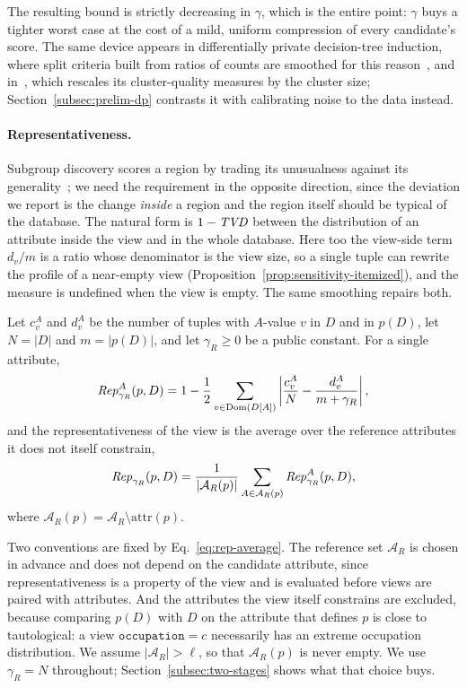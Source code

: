 The resulting bound is strictly decreasing in $\gamma$, which is the entire point: $\gamma$ buys a tighter worst case at the cost of a mild, uniform compression of every candidate's score.
The same device appears in differentially private decision-tree induction, where split criteria built from ratios of counts are smoothed for this reason~\cite{FriedmanSchuster10}, and in~\cite{DPClustX}, which rescales its cluster-quality measures by the cluster size; Section~\ref{subsec:prelim-dp} contrasts it with calibrating noise to the data instead.

\paragraph{Representativeness.}
Subgroup discovery scores a region by trading its unusualness against its generality~\cite{Wrobel97,HerreraCGJ11}; we need the requirement in the opposite direction, since the deviation we report is the change \emph{inside} a region and the region itself should be typical of the database.
The natural form is $1-\mathit{TVD}$ between the distribution of an attribute inside the view and in the whole database.
Here too the view-side term $d_v/m$ is a ratio whose denominator is the view size, so a single tuple can rewrite the profile of a near-empty view (Proposition~\ref{prop:sensitivity-itemized}), and the measure is undefined when the view is empty.
The same smoothing repairs both.

\begin{definition}
\label{def:rep}
Let $c^A_v$ and $d^A_v$ be the number of tuples with $A$-value $v$ in $D$ and in $p(D)$, let $N=|D|$ and $m=|p(D)|$, and let $\gamma_R\ge0$ be a public constant.
For a single attribute,
\begin{equation}
\mathit{Rep}^A_{\gamma_R}(p,D)=1-\frac{1}{2}\sum_{v\in\operatorname{Dom}(D[A])}\left|\frac{c^A_v}{N}-\frac{d^A_v}{m+\gamma_R}\right| ,
\label{eq:representativeness-proxy}
\end{equation}
and the representativeness of the view is the average over the reference attributes it does not itself constrain,
\begin{equation}
\mathit{Rep}_{\gamma_R}(p,D)=\frac{1}{|\mathcal{A}_R(p)|}\sum_{A\in\mathcal{A}_R(p)}\mathit{Rep}^A_{\gamma_R}(p,D),
\label{eq:rep-average}
\end{equation}
where $\mathcal{A}_R(p)=\mathcal{A}_R\setminus\mathrm{attr}(p)$.
\end{definition}

Two conventions are fixed by Eq.~\eqref{eq:rep-average}.
The reference set $\mathcal{A}_R$ is chosen in advance and does not depend on the candidate attribute, since representativeness is a property of the view and is evaluated before views are paired with attributes.
And the attributes the view itself constrains are excluded, because comparing $p(D)$ with $D$ on the attribute that defines $p$ is close to tautological: a view $\texttt{occupation}=c$ necessarily has an extreme occupation distribution.
We assume $|\mathcal{A}_R|>\ell$, so that $\mathcal{A}_R(p)$ is never empty.
We use $\gamma_R=N$ throughout; Section~\ref{subsec:two-stages} shows what that choice buys.

